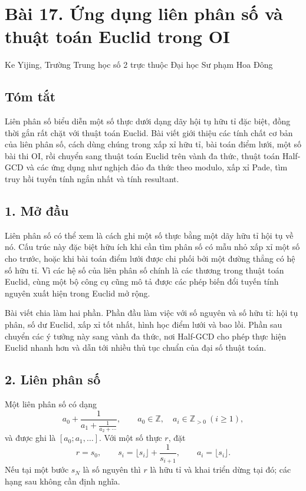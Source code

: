 \documentclass[11pt]{article}
\begin{document}
\section*{Bài 17. Ứng dụng liên phân số và thuật toán Euclid trong OI}

\begin{center}
Ke Yijing, Trường Trung học số 2 trực thuộc Đại học Sư phạm Hoa Đông
\end{center}

\subsection*{Tóm tắt}

Liên phân số biểu diễn một số thực dưới dạng dãy hội tụ hữu tỉ đặc biệt, đồng
thời gắn rất chặt với thuật toán Euclid. Bài viết giới thiệu các tính chất cơ
bản của liên phân số, cách dùng chúng trong xấp xỉ hữu tỉ, bài toán điểm lưới,
một số bài thi OI, rồi chuyển sang thuật toán Euclid trên vành đa thức, thuật
toán Half-GCD và các ứng dụng như nghịch đảo đa thức theo modulo, xấp xỉ Pade,
tìm truy hồi tuyến tính ngắn nhất và tính resultant.

\subsection*{1. Mở đầu}

Liên phân số có thể xem là cách ghi một số thực bằng một dãy hữu tỉ hội tụ về
nó. Cấu trúc này đặc biệt hữu ích khi cần tìm phân số có mẫu nhỏ xấp xỉ một
số cho trước, hoặc khi bài toán điểm lưới được chi phối bởi một đường thẳng
có hệ số hữu tỉ. Vì các hệ số của liên phân số chính là các thương trong thuật
toán Euclid, cùng một bộ công cụ cũng mô tả được các phép biến đổi tuyến tính
nguyên xuất hiện trong Euclid mở rộng.

Bài viết chia làm hai phần. Phần đầu làm việc với số nguyên và số hữu tỉ: hội
tụ phân, số dư Euclid, xấp xỉ tốt nhất, hình học điểm lưới và bao lồi. Phần
sau chuyển các ý tưởng này sang vành đa thức, nơi Half-GCD cho phép thực hiện
Euclid nhanh hơn và dẫn tới nhiều thủ tục chuẩn của đại số thuật toán.

\subsection*{2. Liên phân số}

Một liên phân số có dạng
\[
  a_0+\frac{1}{a_1+\frac{1}{a_2+\cdots}},
  \qquad a_0\in\mathbb Z,\quad a_i\in\mathbb Z_{>0}\ (i\ge 1),
\]
và được ghi là \([a_0;a_1,\ldots]\). Với một số thực \(r\), đặt
\[
  r=s_0,\qquad s_i=\lfloor s_i\rfloor+\frac{1}{s_{i+1}},
  \qquad a_i=\lfloor s_i\rfloor .
\]
Nếu tại một bước \(s_N\) là số nguyên thì \(r\) là hữu tỉ và khai triển dừng
tại đó; các hạng sau không cần định nghĩa.
\end{document}
